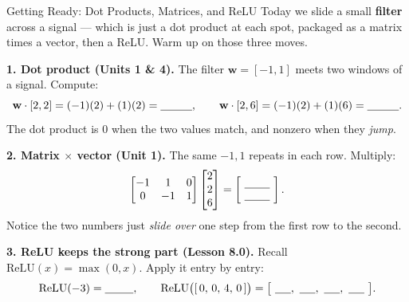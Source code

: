 \documentclass[10pt]{article}
\newcommand{\ww}{\mathbf{w}}
\newcommand{\relu}{\mathrm{ReLU}}
\begin{document}
\namedateperiod

\vspace{0.12in}

\begin{notesbox}{Getting Ready: Dot Products, Matrices, and ReLU}
\small Today we slide a small \textbf{filter} across a signal --- which is just a dot product at each spot,
packaged as a matrix times a vector, then a ReLU. Warm up on those three moves.

\vspace{4pt}
\textbf{1. Dot product (Units 1 \& 4).} The filter $\ww=[-1,1]$ meets two windows of a signal. Compute:
\[
  \ww\cdot[2,2]=(-1)(2)+(1)(2)=\blank{1.0cm},\qquad \ww\cdot[2,6]=(-1)(2)+(1)(6)=\blank{1.0cm}.
\]
The dot product is $0$ when the two values match, and nonzero when they \emph{jump}.

\vspace{4pt}
\textbf{2. Matrix $\times$ vector (Unit 1).} The same $-1,1$ repeats in each row. Multiply:
\[
  \begin{bmatrix} -1 & 1 & 0\\ 0 & -1 & 1 \end{bmatrix}\begin{bmatrix}2\\2\\6\end{bmatrix}
  =\begin{bmatrix}\ \blank{0.8cm}\ \\[-1pt] \blank{0.8cm}\end{bmatrix}.
\]
Notice the two numbers just \emph{slide over} one step from the first row to the second.

\vspace{4pt}
\textbf{3. ReLU keeps the strong part (Lesson 8.0).} Recall $\relu(x)=\max(0,x)$. Apply it entry by entry:
\[
  \relu(-3)=\blank{0.9cm},\qquad \relu\big([\,0,\,0,\,4,\,0\,]\big)=\big[\ \blank{0.5cm},\ \blank{0.5cm},\ \blank{0.5cm},\ \blank{0.5cm}\ \big].
\]
\end{notesbox}
\end{document}
